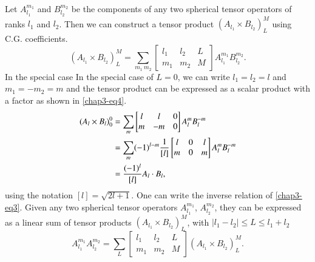 Let $A_{l_1}^{m_1}$ and $B_{l_2}^{m_2}$ be the components of any two spherical tensor operators of ranks $l_1$ and $l_2$. Then we can construct a tensor product $(A_{l_1} \times B_{l_2})^M_L$ using C.G. coefficients.
\begin{equation}
(A_{l_1} \times B_{l_2})^M_L = \sum_{m_1 ~m_2} 
\begin{bmatrix}
  l_1 & l_2 & L\\
  m_1 & m_2 & M
\end{bmatrix}
A_{l_1}^{m_1} B_{l_2}^{m_2}.  \label{chap3-eq3}
\end{equation}
In the special case In the special case of $L = 0$, we can write $l_1 = l_2 = l$ and $m_1 = -m_2 = m$ and the
tensor product can be expressed as a scalar product with a factor as shown in \eqref{chap3-eq4}.
\begin{align}
  (A_l \times B_l)^0_0 & = \sum_{m}
  \begin{bmatrix}  l & l & 0\\    m & -m & 0  \end{bmatrix}  A_l^m B_l^{-m}\notag\\
  & = \sum_m (-1)^{l-m} \frac{1}{[l]}
  \begin{bmatrix}    l & 0 & l\\    m & 0 & m  \end{bmatrix}  A_l^m B_l^{-m}\notag\\
  & = \frac{(-1)^l}{[l]} A_l \cdot B_l, \label{chap3-eq4}
\end{align}
using the notation $[l]=\sqrt{2l+1}$. One can write the inverse relation of \eqref{chap3-eq3}. Given any two spherical tensor operators $A_{l_1}^{m_1}$, $A_{l_2}^{m_2}$, they can be expressed as a linear sum of tensor products $(A_{l_1} \times B_{l_2})^M_L$, with $|l_1 -  l_2 | \leq L \leq l_1 + l_2$ 
\begin{equation}
A_{l_1}^{m_1} A_{l_2}^{m_2} = \sum_{L} 
\begin{bmatrix}
l_1 & l_2 &L\\
m_1 & m_2 & M
\end{bmatrix} (A_{l_1} \times B_{l_2})^M_L. \label{chap3-eq5}
\end{equation}

